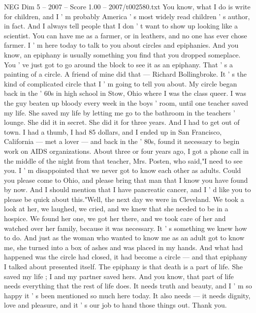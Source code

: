 \begin{textsample}{NEG Dim 5 – 2007 – Score 1.00 – 2007/t002580.txt}  \label{ex:f5_neg_056}
You know, what I do is write for children, and I ' m probably America ' s most widely read children ' s author, in fact.
And I always tell people that I don ' t want to show up looking like a scientist.
You can have me as a farmer, or in leathers, and no one has ever chose farmer.
I ' m here today to talk to you about circles and epiphanies.
And you know, an epiphany is usually something you find that you dropped someplace.
You ' ve just got to go around the block to see it as an epiphany.
That ' s a painting of a circle.
A friend of mine did that — Richard Bollingbroke.
It ' s the kind of complicated circle that I ' m going to tell you about.
My circle began back in the ' 60s in high school in Stow, Ohio where I was the class queer.
I was the guy beaten up bloody every week in the boys ' room, until one teacher saved my life.
She saved my life by letting me go to the bathroom in the teachers ' lounge.
She did it in secret.
She did it for three years.
And I had to get out of town.
I had a thumb, I had 85 dollars, and I ended up in San Francisco, California — met a lover — and back in the ' 80s, found it necessary to begin work on AIDS organizations.
About three or four years ago, I got a phone call in the middle of the night from that teacher, Mrs.
Posten, who said,"I need to see you.
I ' m disappointed that we never got to know each other as adults.
Could you please come to Ohio, and please bring that man that I know you have found by now.
And I should mention that I have pancreatic cancer, and I ' d like you to please be quick about this."Well, the next day we were in Cleveland.
We took a look at her, we laughed, we cried, and we knew that she needed to be in a hospice.
We found her one, we got her there, and we took care of her and watched over her family, because it was necessary.
It ' s something we knew how to do.
And just as the woman who wanted to know me as an adult got to know me, she turned into a box of ashes and was placed in my hands.
And what had happened was the circle had closed, it had become a circle — and that epiphany I talked about presented itself.
The epiphany is that death is a part of life.
She saved my life ; I and my partner saved hers.
And you know, that part of life needs everything that the rest of life does.
It needs truth and beauty, and I ' m so happy it ' s been mentioned so much here today.
It also needs — it needs dignity, love and pleasure, and it ' s our job to hand those things out.
Thank you.

\end{textsample}
